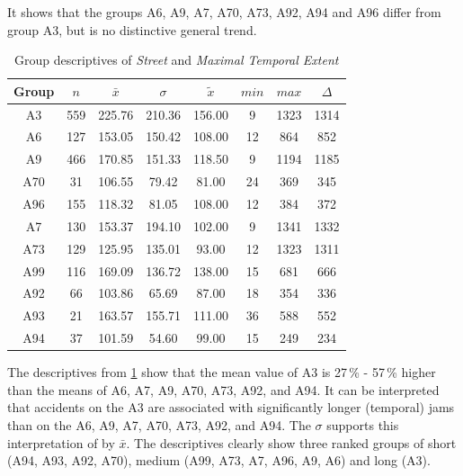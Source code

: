 It shows that the groups A6, A9, A7, A70, A73, A92, A94 and A96 differ from group A3, but is no distinctive general trend.
\begin{table}[ht!]
	\tiny
	\centering
	\begin{tabular}{c|c|c|c|c|c|c|c}
		\toprule
		Group & $n$ & $\bar{x}$ & $\sigma$ & $\tilde{x}$ & $min$ & $max$ & $\Delta$ \\ 
		\midrule
		A3  & 559 & 225.76 & 210.36 & 156.00 & 9  & 1323 & 1314 \\ 
		A6  & 127 & 153.05 & 150.42 & 108.00 & 12 & 864  & 852  \\ 
		A9  & 466 & 170.85 & 151.33 & 118.50 & 9  & 1194 & 1185 \\ 
		A70 & 31  & 106.55 & 79.42  & 81.00  & 24 & 369  & 345  \\ 
		A96 & 155 & 118.32 & 81.05  & 108.00 & 12 & 384  & 372  \\ 
		A7  & 130 & 153.37 & 194.10 & 102.00 & 9  & 1341 & 1332 \\ 
		A73 & 129 & 125.95 & 135.01 & 93.00  & 12 & 1323 & 1311 \\ 
		A99 & 116 & 169.09 & 136.72 & 138.00 & 15 & 681  & 666  \\ 
		A92 & 66  & 103.86 & 65.69  & 87.00  & 18 & 354  & 336  \\ 
		A93 & 21  & 163.57 & 155.71 & 111.00 & 36 & 588  & 552  \\ 
		A94 & 37  & 101.59 & 54.60  & 99.00  & 15 & 249  & 234  \\ 
 		\bottomrule
	\end{tabular}
	\caption{Group descriptives of \textit{Street} and \textit{Maximal Temporal Extent}}
	\label{tbl:descriptives_baysis_matched_Str_TMax}
\end{table}
The descriptives from \cref{tbl:descriptives_baysis_matched_Str_TMax} show that the mean value of A3 is 27\,\% - 57\,\% higher than the means of A6, A7, A9, A70, A73, A92, and A94. It can be interpreted that accidents on the A3 are associated with significantly longer (temporal) jams than on the A6, A9, A7, A70, A73, A92, and A94. The $\sigma$ supports this interpretation of by $\bar{x}$. The descriptives clearly show three ranked groups of short (A94, A93, A92, A70), medium (A99, A73, A7, A96, A9, A6) and long (A3).

